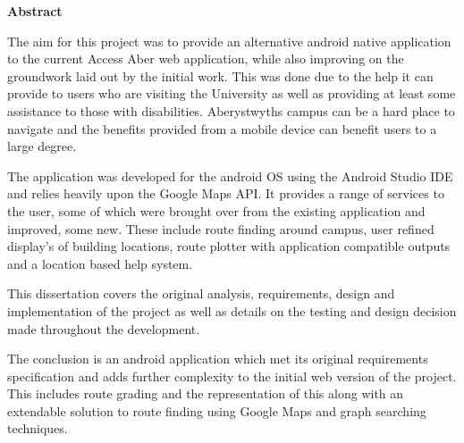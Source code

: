 \thispagestyle{empty}

\begin{center}
    {\LARGE\bf Abstract}
\end{center}

The aim for this project was to provide an alternative android native application to the current Access Aber web application, while also improving on the groundwork laid out by the initial work. This was done due to the help it can provide to users who are visiting the University as well as providing at least some assistance to those with disabilities. Aberystwyths campus can be a hard place to navigate and the benefits provided from a mobile device can benefit users to a large degree. 

The application was developed for the android OS using the Android Studio IDE and relies heavily upon the Google Maps API. It provides a range of services to the user, some of which were brought over from the existing application and improved, some new. These include route finding around campus, user refined display's of building locations, route plotter with application compatible outputs and a location based help system. 

This dissertation covers the original analysis, requirements, design and implementation of the project as well as details on the testing and design decision made throughout the development.

The conclusion is an android application which met its original requirements specification and adds further complexity to the initial web version of the project. This includes route grading and the representation of this along with an extendable solution to route finding using Google Maps and graph searching techniques. 